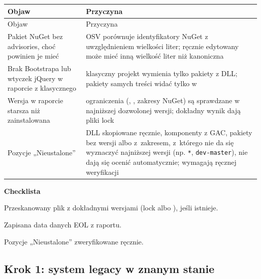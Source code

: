\begin{xltabular}{\linewidth}{@{}>{\raggedright\arraybackslash}p{5.4cm} >{\raggedright\arraybackslash}X@{}}
\toprule
Objaw & Przyczyna \\
\midrule
\endfirsthead
\toprule
Objaw & Przyczyna \\
\midrule
\endhead
Pakiet NuGet bez advisories, choć powinien je mieć & OSV porównuje identyfikatory NuGet z uwzględnieniem wielkości liter; ręcznie edytowany  może mieć inną wielkość liter niż kanoniczna \\
Brak Bootstrapa lub wtyczek jQuery w raporcie z klasycznego  & klasyczny projekt wymienia tylko pakiety z DLL; pakiety samych treści widać tylko w  \\
Wersja w raporcie starsza niż zainstalowana & ograniczenia (, , zakresy NuGet) są sprawdzane w najniższej dozwolonej wersji; dokładny wynik dają pliki lock \\
Pozycje „Nieustalone” & DLL skopiowane ręcznie, komponenty z GAC, pakiety bez wersji albo z~zakresem, z~którego nie da się wyznaczyć najniższej wersji (np. \texttt{*}, \texttt{dev-master}), nie dają się ocenić automatycznie; wymagają ręcznej weryfikacji \\
\bottomrule
\end{xltabular}

\textbf{Checklista}
\begin{checklista}
  \item Przeskanowany plik z dokładnymi wersjami (lock albo ), jeśli istnieje.
  \item Zapisana data danych EOL z raportu.
  \item Pozycje „Nieustalone” zweryfikowane ręcznie.
\end{checklista}


\subsection{Krok 1: system legacy w znanym stanie}\label{sec:procedura-krok1}

